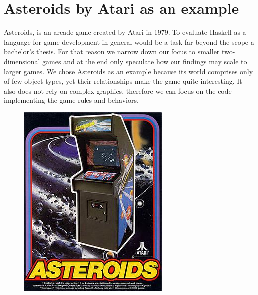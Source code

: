 \documentclass[
  digital, %
  color,   %
  table,   %
  oneside, %
  lof,     %
  lot,     %
]{fithesis3}
\begin{document}
\section{Asteroids by Atari as an example}
\label{sect:whyasteroids}
Asteroids, is an arcade game created by Atari in 1979.
To evaluate Haskell as a language for game development in general
would be a task far beyond the scope a bachelor's thesis. For that reason
we narrow down our focus to smaller two-dimensional games and at the end
only speculate how our findings may scale to larger games.
We chose Asteroids as an example because its world comprises only of
few object types, yet their relationships make the game quite interesting.
It also does not rely on complex graphics, therefore we can focus
on the code implementing the game rules and behaviors.
\begin{figure}
    \begin{minipage}{0.33\textwidth}
        \includegraphics[height=1.3\textwidth]{images/Asteroids-arcadegame.jpg}\hfill
    \end{minipage}

\end{figure}
\end{document}
